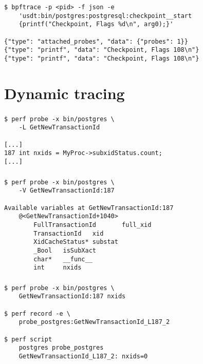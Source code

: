 \documentclass[usenames,dvipsnames, 18pt, compress, aspectratio=169]{beamer}
\begin{document}
\begin{frame}[fragile]{}
    \frametitle{}
    \begin{center}
        \begin{verbatim}
$ bpftrace -p <pid> -f json -e
    'usdt:bin/postgres:postgresql:checkpoint__start
    {printf("Checkpoint, Flags %d\n", arg0);}'

{"type": "attached_probes", "data": {"probes": 1}}
{"type": "printf", "data": "Checkpoint, Flags 108\n"}
{"type": "printf", "data": "Checkpoint, Flags 108\n"}
        \end{verbatim}
    \end{center}
\end{frame}

\section{Dynamic tracing}

\begin{frame}[fragile]{}
    \frametitle{}
    \begin{center}
        \begin{verbatim}
$ perf probe -x bin/postgres \
    -L GetNewTransactionId

[...]
187 int nxids = MyProc->subxidStatus.count;
[...]
        \end{verbatim}
    \end{center}
\end{frame}

\begin{frame}[fragile]{}
    \frametitle{}
    \begin{center}
        \begin{verbatim}
$ perf probe -x bin/postgres \
    -V GetNewTransactionId:187

Available variables at GetNewTransactionId:187
	@<GetNewTransactionId+1040>
		FullTransactionId       full_xid
		TransactionId   xid
		XidCacheStatus* substat
		_Bool   isSubXact
		char*   __func__
		int     nxids
        \end{verbatim}
    \end{center}
\end{frame}

\begin{frame}[fragile]{}
    \frametitle{}
    \begin{center}
        \begin{verbatim}
$ perf probe -x bin/postgres \
    GetNewTransactionId:187 nxids

$ perf record -e \
	probe_postgres:GetNewTransactionId_L187_2

$ perf script
	postgres probe_postgres
	GetNewTransactionId_L187_2: nxids=0

        \end{verbatim}
    \end{center}
\end{frame}
\end{document}
